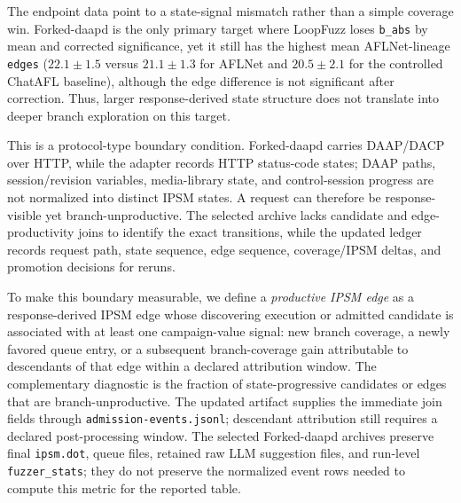 \documentclass[final,5p,times,number]{elsarticle}
\begin{document}
The endpoint data point to a state-signal mismatch rather than a simple coverage win. Forked-daapd is the only primary target where LoopFuzz loses \texttt{b\_abs} by mean and corrected significance, yet it still has the highest mean AFLNet-lineage \texttt{edges} ($22.1{\pm}1.5$ versus $21.1{\pm}1.3$ for AFLNet and $20.5{\pm}2.1$ for the controlled ChatAFL baseline), although the edge difference is not significant after correction. Thus, larger response-derived state structure does not translate into deeper branch exploration on this target.

This is a protocol-type boundary condition. Forked-daapd carries DAAP/DACP over HTTP, while the adapter records HTTP status-code states; DAAP paths, session/revision variables, media-library state, and control-session progress are not normalized into distinct IPSM states. A request can therefore be response-visible yet branch-unproductive. The selected archive lacks candidate and edge-productivity joins to identify the exact transitions, while the updated ledger records request path, state sequence, edge sequence, coverage/IPSM deltas, and promotion decisions for reruns.

To make this boundary measurable, we define a \emph{productive IPSM edge} as a response-derived IPSM edge whose discovering execution or admitted candidate is associated with at least one campaign-value signal: new branch coverage, a newly favored queue entry, or a subsequent branch-coverage gain attributable to descendants of that edge within a declared attribution window. The complementary diagnostic is the fraction of state-progressive candidates or edges that are branch-unproductive. The updated artifact supplies the immediate join fields through \texttt{admission-events.jsonl}; descendant attribution still requires a declared post-processing window. The selected Forked-daapd archives preserve final \texttt{ipsm.dot}, queue files, retained raw LLM suggestion files, and run-level \texttt{fuzzer\_stats}; they do not preserve the normalized event rows needed to compute this metric for the reported table.
\end{document}
